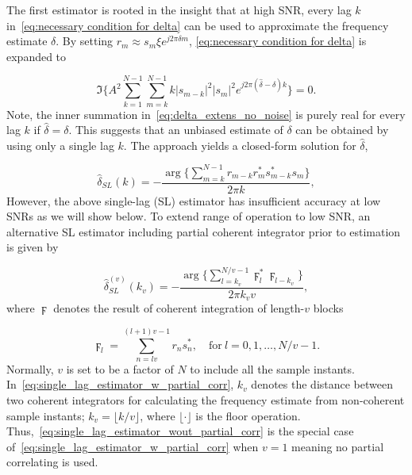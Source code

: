 The first estimator is rooted in the insight that at high SNR, every lag $k$ in~\eqref{eq:necessary condition for delta}
can be used to approximate the frequency estimate $\delta$. By setting $r_m\approx s_m\xi e^{j2\pi\delta m}$,
\eqref{eq:necessary condition for delta} is expanded to

\begin{equation}
  \label{eq:delta_extens_no_noise}
  \Im\bigg\{A^2\sum_{k=1}^{N-1}\sum_{m=k}^{N-1}k|s_{m-k}|^2|s_m|^2e^{j2\pi (\hat{\delta}-\delta)k}\bigg\}=0.
  \end{equation}
Note, the inner summation in~\eqref{eq:delta_extens_no_noise} is purely real for every lag $k$ if $\hat{\delta}=\delta$.
This suggests that an unbiased estimate of $\delta$ can be obtained by using only a single lag $k$. The approach yields
a closed-form solution for $\hat{\delta}$,

\begin{equation}
  \label{eq:single_lag_estimator_wout_partial_corr}
  \hat{\delta}_{SL}(k)=-\frac{\arg\big\{\sum_{m=k}^{N-1}r_{m-k}r_m^*s_{m-k}^*s_m\big\}}{2\pi k},
\end{equation}
However, the above single-lag (SL) estimator has insufficient
accuracy at low SNRs as we will show below. To extend range of operation to low SNR,
an alternative SL estimator including partial coherent integrator
prior to estimation is given by

\begin{equation}
  \label{eq:single_lag_estimator_w_partial_corr}
  \hat{\delta}_{SL}^{(v)}(k_v)=-\frac{\arg\big\{\sum_{l=k_v}^{N/v-1}\digamma_l^*\digamma_{l-k_v}\big\}}{2\pi k_vv},
\end{equation}
where $\digamma$ denotes the result of coherent integration of length-$v$ blocks

\begin{equation}
  \label{eq:coherent_integrator}
  \digamma_l=\sum_{n=lv}^{(l+1)v-1}r_ns_n^*, \quad \text{for}~l=0,1,\ldots,N/v{-}1.
\end{equation}
Normally, $v$ is set to be a factor of $N$ to include all the sample instants.
In~\eqref{eq:single_lag_estimator_w_partial_corr}, $k_v$ denotes the distance between
two coherent integrators for calculating the frequency estimate from non-coherent sample instants;
$k_v=\lfloor k/v \rfloor$, where $\lfloor \cdot \rfloor$ is the floor operation. 
Thus,~\eqref{eq:single_lag_estimator_wout_partial_corr} is the special case of~\eqref{eq:single_lag_estimator_w_partial_corr}
when $v=1$ meaning no partial correlating is used.


